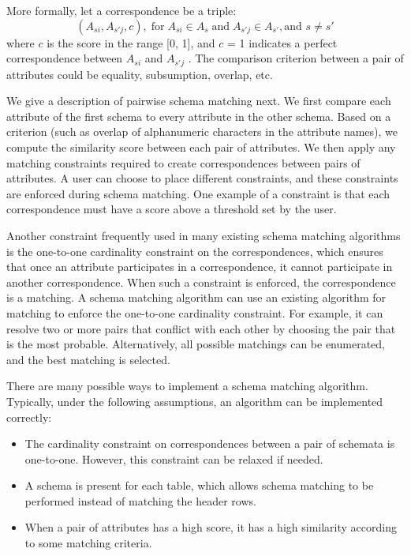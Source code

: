 More formally, let a correspondence be a triple:
\[
(A_{si},A_{s'j},c), \; \textrm{for} \; A_{si}\in A_{s} \; \textrm{and} \; A_{s'j}\in A_{s'},\text{and }s\neq s'
\]
where $c$ is the score in the range {[}0, 1{]}, and $c$ = 1 indicates a perfect correspondence between $A_{si}$ and $A_{s'j}$ . The comparison criterion between a pair of attributes could be equality, subsumption, overlap, etc.

We give a description of pairwise schema matching next. We first compare each attribute of the first schema to every attribute in the other schema. Based on a criterion (such as overlap of alphanumeric characters in the attribute names), we compute the similarity score between each pair of attributes. We then apply any matching constraints required to create correspondences between pairs of attributes. A user can choose to place different constraints, and these constraints are enforced during schema matching. One example of a constraint is that each correspondence must have a score above a threshold set by the user.

Another constraint frequently used in many existing schema matching algorithms is the one-to-one cardinality constraint on the correspondences, which ensures that once an attribute participates in a correspondence, it cannot participate in another correspondence. When such a constraint is enforced, the correspondence is a matching. A schema matching algorithm can use an existing algorithm for matching to enforce the one-to-one cardinality constraint. For example, it can resolve two or more pairs that conflict with each other by choosing the pair that is the most probable. Alternatively, all possible matchings can be enumerated, and the best matching is selected.

There are many possible ways to implement a schema matching algorithm. Typically, under the following assumptions, an algorithm can be implemented correctly:

\begin{itemize}
\item The cardinality constraint on correspondences between a pair of schemata is one-to-one. However, this constraint can be relaxed if needed.
\item A schema is present for each table, which allows schema matching to be performed instead of matching the header rows.
\item When a pair of attributes has a high score, it has a high similarity according to some matching criteria.
\end{itemize}

